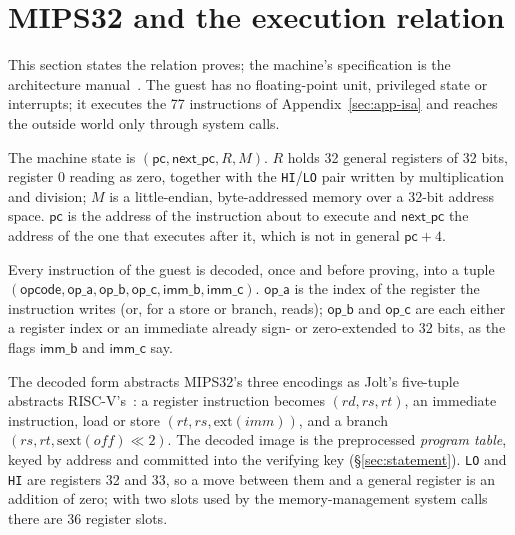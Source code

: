 \section{MIPS32 and the execution relation}
\label{sec:isa}

This section states the relation \Ziren{} proves; the machine's specification is the architecture manual~\citep{mips32-isa}. The guest has no floating-point unit, privileged state or interrupts; it executes the 77 instructions of Appendix~\ref{sec:app-isa} and reaches the outside world only through system calls.

\begin{definition}
\label{def:state}
The machine state is $(\mathsf{pc}, \mathsf{next\_pc}, R, M)$. $R$ holds 32 general registers of 32 bits, register 0 reading as zero, together with the \texttt{HI}/\texttt{LO} pair written by multiplication and division; $M$ is a little-endian, byte-addressed memory over a 32-bit address space. $\mathsf{pc}$ is the address of the instruction about to execute and $\mathsf{next\_pc}$ the address of the one that executes after it, which is not in general $\mathsf{pc}+4$.
\end{definition}

\begin{definition}
\label{def:format}
Every instruction of the guest is decoded, once and before proving, into a tuple $(\mathsf{opcode}, \mathsf{op\_a}, \mathsf{op\_b}, \mathsf{op\_c}, \mathsf{imm\_b}, \mathsf{imm\_c})$. $\mathsf{op\_a}$ is the index of the register the instruction writes (or, for a store or branch, reads); $\mathsf{op\_b}$ and $\mathsf{op\_c}$ are each either a register index or an immediate already sign- or zero-extended to 32 bits, as the flags $\mathsf{imm\_b}$ and $\mathsf{imm\_c}$ say.
\end{definition}

The decoded form abstracts MIPS32's three encodings as Jolt's five-tuple abstracts RISC-V's~\citep{jolt}: a register instruction becomes $(\mathit{rd}, \mathit{rs}, \mathit{rt})$, an immediate instruction, load or store $(\mathit{rt}, \mathit{rs}, \mathrm{ext}(\mathit{imm}))$, and a branch $(\mathit{rs}, \mathit{rt}, \mathrm{sext}(\mathit{off}) \ll 2)$. The decoded image is the preprocessed \emph{program table}, keyed by address and committed into the verifying key (\S\ref{sec:statement}). \texttt{LO} and \texttt{HI} are registers 32 and 33, so a move between them and a general register is an addition of zero; with two slots used by the memory-management system calls there are 36 register slots.

